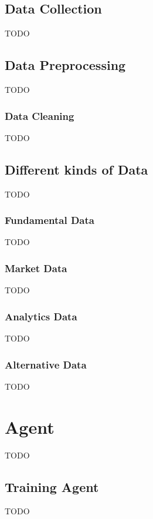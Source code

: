 \begin{itemize}
\section{Data Collection}\label{sec:data-collection}
TODO


\section{Data Preprocessing}\label{sec:data-preprocessing}
TODO

\subsection{Data Cleaning}\label{subsec:data-cleaning}
TODO


\section{Different kinds of Data}\label{sec:different-kinds-of-data}
TODO

\subsection{Fundamental Data}\label{subsec:fundamental-data}
TODO

\subsection{Market Data}\label{subsec:market-data}
TODO

\subsection{Analytics Data}\label{subsec:analytics-data}
TODO

\subsection{Alternative Data}\label{subsec:alternative-data}
TODO




\chapter{Agent}\label{ch:agent}
TODO


\section{Training Agent}\label{sec:training-agent}
TODO



\end{itemize}
